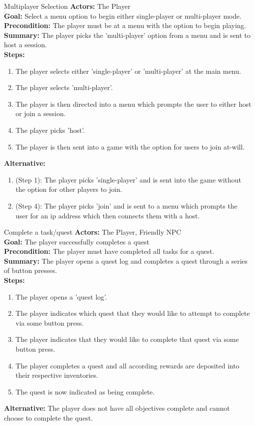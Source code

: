 \documentclass[12pt]{report}
\begin{document}
\begin{subsection}{Multiplayer Selection}
\textbf{Actors:} The Player \\
\textbf{Goal:} Select a menu option to begin either single-player or multi-player mode. \\
\textbf{Precondition:} The player must be at a menu with the option to begin playing. \\
\textbf{Summary:} The player picks the 'multi-player' option from a menu and is sent to host a session. \\
\textbf{Steps:}
\begin{enumerate}
	\item The player selects either 'single-player' or 'multi-player' at the main menu.
	\item The player selects 'multi-player'.
	\item The player is then directed into a menu which prompts the user to either host or join a session.
	\item The player picks 'host'.
	\item The player is then sent into a game with the option for users to join at-will.
\end{enumerate}
\textbf{Alternative:}
\begin{enumerate}
	\item (Step 1): The player picks 'single-player' and is sent into the game without the option for other players to join.
	\item (Step 4): The player picks 'join' and is sent to a menu which prompts the user for an ip address which then connects them with a host.
\end{enumerate}
\end{subsection}

\begin{subsection}{Complete a task/quest}
\textbf{Actors:} The Player, Friendly NPC \\
\textbf{Goal:} The player successfully completes a quest \\
\textbf{Precondition:} The player must have completed all tasks for a quest. \\
\textbf{Summary:} The player opens a quest log and completes a quest through a series of button presses. \\
\textbf{Steps:}
\begin{enumerate}
	\item The player opens a 'quest log'.
	\item The player indicates which quest that they would like to attempt to complete via some button press.
	\item The player indicates that they would like to complete that quest via some button press.
	\item The player completes a quest and all according rewards are deposited into their respective inventories.
	\item The quest is now indicated as being complete.
\end{enumerate}
\textbf{Alternative:} The player does not have all objectives complete and cannot choose to complete the quest.
\end{subsection}
\end{document}
